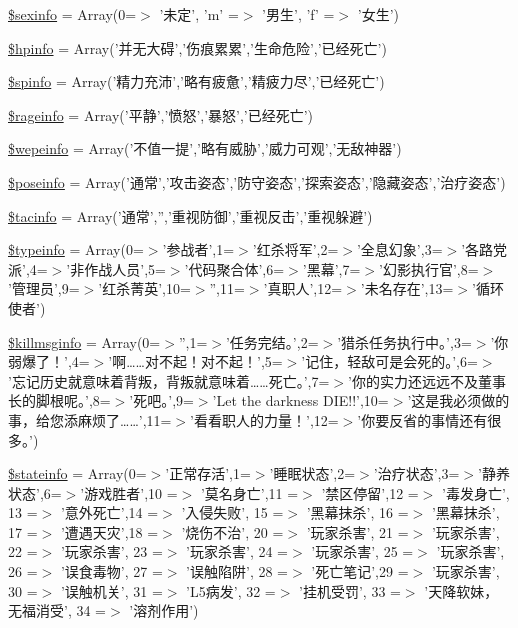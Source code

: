 \begin{DoxyCompactItemize}
\item 
\hyperlink{resources_8php_a7fc213b5009edd4913f9a3f66776c721}{\$sexinfo} = Array(0=$>$ '未定', 'm' =$>$ '男生', 'f' =$>$ '女生')
\item 
\hyperlink{resources_8php_a6f91f38ee66d31d99255d9dc86032980}{\$hpinfo} = Array('并无大碍','伤痕累累','生命危险','已经死亡')
\item 
\hyperlink{resources_8php_a79b3890cc1a3fac35858fb155b285743}{\$spinfo} = Array('精力充沛','略有疲惫','精疲力尽','已经死亡')
\item 
\hyperlink{resources_8php_a5f383706ecfe4033fc5ba410b5efe3a0}{\$rageinfo} = Array('平静','愤怒','暴怒','已经死亡')
\item 
\hyperlink{resources_8php_a24d2c967a140f9ff99ba082c9353f696}{\$wepeinfo} = Array('不值一提','略有威胁','威力可观','无敌神器')
\item 
\hyperlink{resources_8php_af6cbbc5cff2f1db3093587d7495600ae}{\$poseinfo} = Array('通常','攻击姿态','防守姿态','探索姿态','隐藏姿态','治疗姿态')
\item 
\hyperlink{resources_8php_aed45c4ff2bc7ce0af6c4b05414cd1373}{\$tacinfo} = Array('通常','','重视防御','重视反击','重视躲避')
\item 
\hyperlink{resources_8php_afeaf726d0642146d7bf10c04e2c99075}{\$typeinfo} = Array(0=$>$'参战者',1=$>$'红杀将军',2=$>$'全息幻象',3=$>$'各路党派',4=$>$'非作战人员',5=$>$'代码聚合体',6=$>$'黑幕',7=$>$'幻影执行官',8=$>$'管理员',9=$>$'红杀菁英',10=$>$'',11=$>$'真职人',12=$>$'未名存在',13=$>$'循环使者')
\item 
\hyperlink{resources_8php_acfdab9efcdacf2869477a5e833712b40}{\$killmsginfo} = Array(0=$>$'',1=$>$'任务完结。',2=$>$'猎杀任务执行中。',3=$>$'你弱爆了！',4=$>$'啊……对不起！对不起！',5=$>$'记住，轻敌可是会死的。',6=$>$'忘记历史就意味着背叛，背叛就意味着……死亡。',7=$>$'你的实力还远远不及董事长的脚根呢。',8=$>$'死吧。',9=$>$'Let the darkness D\+I\+E!!',10=$>$'这是我必须做的事，给您添麻烦了……',11=$>$'看看职人的力量！',12=$>$'你要反省的事情还有很多。')
\item 
\hyperlink{resources_8php_a014f40ed69f3ce2bd7a3263f5b5c9d91}{\$stateinfo} = Array(0=$>$'正常存活',1=$>$'睡眠状态',2=$>$'治疗状态',3=$>$'静养状态',6=$>$'游戏胜者',10 =$>$ '莫名身亡',11 =$>$ '禁区停留',12 =$>$ '毒发身亡', 13 =$>$ '意外死亡',14 =$>$ '入侵失败', 15 =$>$ '黑幕抹杀', 16 =$>$ '黑幕抹杀', 17 =$>$ '遭遇天灾',18 =$>$ '烧伤不治', 20 =$>$ '玩家杀害', 21 =$>$ '玩家杀害', 22 =$>$ '玩家杀害', 23 =$>$ '玩家杀害', 24 =$>$ '玩家杀害', 25 =$>$ '玩家杀害', 26 =$>$ '误食毒物', 27 =$>$ '误触陷阱', 28 =$>$ '死亡笔记',29 =$>$ '玩家杀害', 30 =$>$ '误触机关', 31 =$>$ 'L5病发', 32 =$>$ '挂机受罚', 33 =$>$ '天降软妹，无福消受', 34 =$>$ '溶剂作用')

\end{DoxyCompactItemize}
